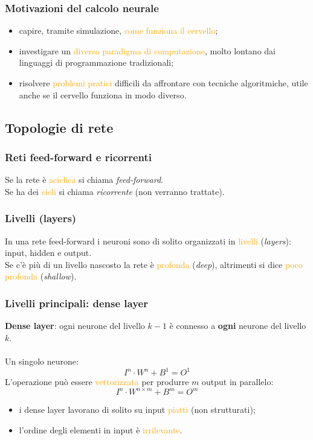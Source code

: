 \documentclass[a4paper,12pt]{article}
\newcommand{\hl}[1]{\textcolor{orange}{#1}}
\begin{document}
\subsubsection{Motivazioni del calcolo neurale}
\begin{itemize}
\item capire, tramite simulazione, \hl{come funziona il cervello};
\item investigare un \hl{diverso paradigma di computazione}, molto lontano dai linguaggi di programmazione tradizionali;
\item risolvere \hl{problemi pratici} difficili da affrontare con tecniche algoritmiche, utile anche se il cervello funziona in modo diverso.
\end{itemize}

\subsection{Topologie di rete}
\subsubsection{Reti feed-forward e ricorrenti}
Se la rete è \hl{aciclica} si chiama \textit{feed-forward}.\\
Se ha dei \hl{cicli} si chiama \textit{ricorrente} (non verranno trattate).

\subsubsection{Livelli (layers)}
In una rete feed-forward i neuroni sono di solito organizzati in \hl{livelli} (\textit{layers}): input, hidden e output.\\
Se c'è più di un livello nascosto la rete è \hl{profonda} (\textit{deep}), altrimenti si dice \hl{poco profonda} (\textit{shallow}).

\subsubsection{Livelli principali: dense layer}
\textbf{Dense layer}: ogni neurone del livello $k-1$ è connesso a \textbf{ogni} neurone del livello $k$.\\
\vspace{1px}\\
Un singolo neurone:
\[ I^n \cdot W^n + B^1 = O^1 \]
L'operazione può essere \hl{vettorizzata} per produrre $m$ output in parallelo:
\[ I^n \cdot W^{n \times m} + B^m = O^m \]
\begin{itemize}
\item i dense layer lavorano di solito su input \hl{piatti} (non strutturati);
\item l'ordine degli elementi in input è \hl{irrilevante}.
\end{itemize}
\end{document}
